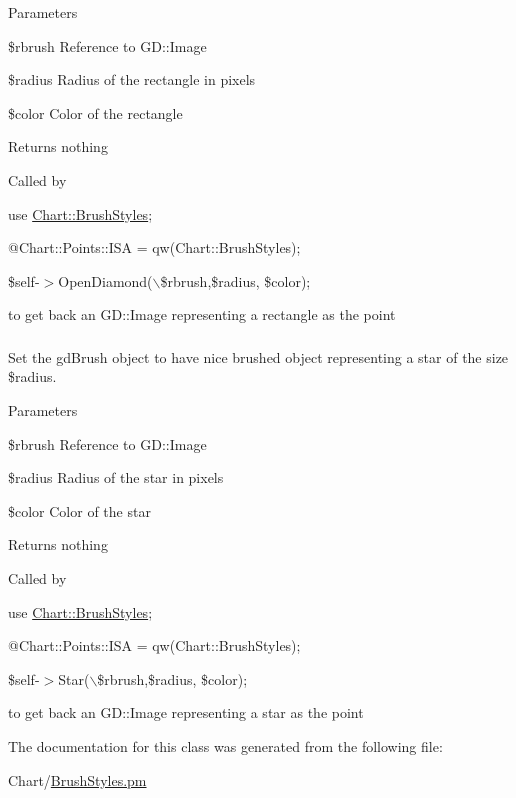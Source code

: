 \begin{DoxyParams}{Parameters}
\item[\mbox{\tt[in]} {\em $\ast$GD::Image}]\$rbrush Reference to GD::Image \item[\mbox{\tt[in]} {\em int}]\$radius Radius of the rectangle in pixels \item[\mbox{\tt[in]} {\em int}]\$color Color of the rectangle \end{DoxyParams}
\begin{DoxyReturn}{Returns}
nothing
\end{DoxyReturn}
Called by\par
 use \hyperlink{classChart_1_1BrushStyles}{Chart::BrushStyles};\par
 @Chart::Points::ISA = qw(Chart::BrushStyles);\par
 \$self-\/$>$OpenDiamond($\backslash$\$rbrush,\$radius, \$color);\par
 to get back an GD::Image representing a rectangle as the point \hypertarget{classChart_1_1BrushStyles_ae2f9c23e20ca5e9b329d5fe3630fc790}{
\subsubsection[{Star}]{}}
\label{classChart_1_1BrushStyles_ae2f9c23e20ca5e9b329d5fe3630fc790}


Set the gdBrush object to have nice brushed object representing a star of the size \$radius. 


\begin{DoxyParams}{Parameters}
\item[\mbox{\tt[in]} {\em $\ast$GD::Image}]\$rbrush Reference to GD::Image \item[\mbox{\tt[in]} {\em int}]\$radius Radius of the star in pixels \item[\mbox{\tt[in]} {\em int}]\$color Color of the star \end{DoxyParams}
\begin{DoxyReturn}{Returns}
nothing
\end{DoxyReturn}
Called by\par
 use \hyperlink{classChart_1_1BrushStyles}{Chart::BrushStyles};\par
 @Chart::Points::ISA = qw(Chart::BrushStyles);\par
 \$self-\/$>$Star($\backslash$\$rbrush,\$radius, \$color);\par
 to get back an GD::Image representing a star as the point 

The documentation for this class was generated from the following file:\begin{DoxyCompactItemize}
\item 
Chart/\hyperlink{BrushStyles_8pm}{BrushStyles.pm}\end{DoxyCompactItemize}
